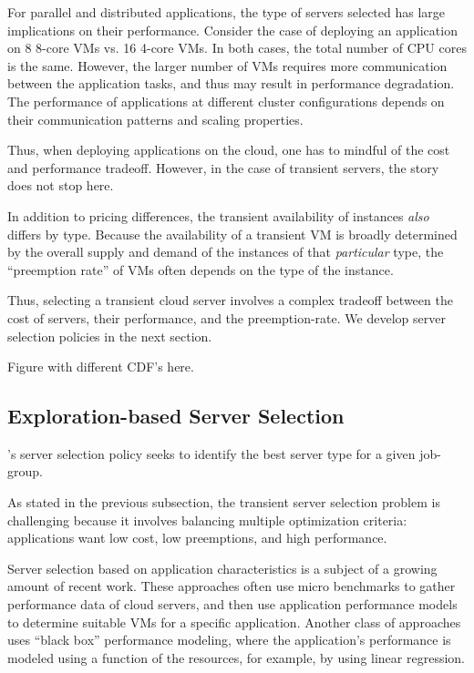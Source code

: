 For parallel and distributed applications, the type of servers selected has large implications on their performance.
Consider the case of deploying an application on 8 8-core VMs vs. 16 4-core VMs.
In both cases, the total number of CPU cores is the same.
However, the larger number of VMs requires more communication between the application tasks, and thus may result in performance degradation.
The performance of applications at different cluster configurations depends on their communication patterns and scaling properties. 



Thus, when deploying applications on the cloud, one has to mindful of the cost and performance tradeoff.
However, in the case of transient servers, the story does not stop here. 


In addition to pricing differences, the transient availability of instances \emph{also} differs by type.
Because the availability of a transient VM is broadly determined by the overall supply and demand of the instances of that \emph{particular} type, the ``preemption rate'' of VMs often depends on the type of the instance.



Thus, selecting a transient cloud server involves a complex tradeoff between the cost of servers, their performance, and the preemption-rate.
We develop server selection policies in the next section.

Figure with different CDF's here.


\subsection{Exploration-based Server Selection}

\sysname's server selection policy seeks to identify the best server type for a given job-group.

As stated in the previous subsection, the transient server selection problem is challenging because it involves balancing multiple optimization criteria: applications want low cost, low preemptions, and high performance.

Server selection based on application characteristics is a subject of a growing amount of recent work.
These approaches often use micro benchmarks to gather performance data of cloud servers, and then use application performance models to determine suitable VMs for a specific application.
Another class of approaches uses ``black box'' performance modeling, where the application's performance is modeled using a function of the resources, for example, by using linear regression.

